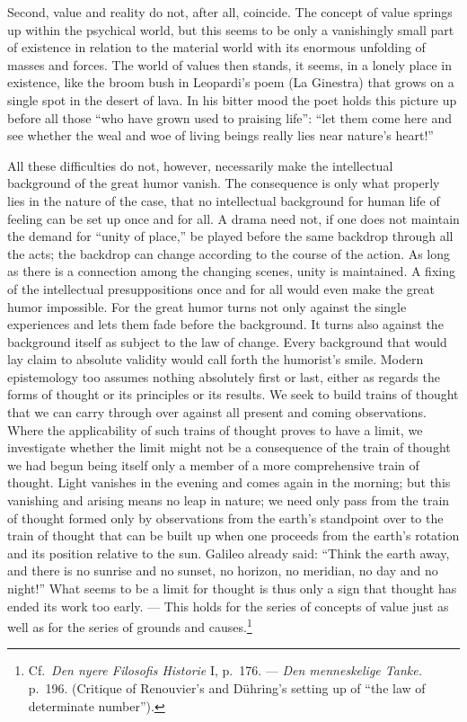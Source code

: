 \documentclass[12pt]{book}
\newcommand{\opage}[1]{\marginnote{\footnotesize\textit{[#1]}}}
\begin{document}
Second, value and reality do not, after all, coincide. The concept of value springs up
within the psychical world, but this \opage{119}seems to be only a vanishingly small part
of existence in relation to the material world with its enormous unfolding of masses and
forces. The world of values then stands, it seems, in a lonely place in existence, like the
broom bush in Leopardi's poem (La Ginestra) that grows on a single spot in the desert of
lava. In his bitter mood the poet holds this picture up before all those ``who have grown
used to praising life'': ``let them come here and see whether the weal and woe of living
beings really lies near nature's heart!''

All these difficulties do not, however, necessarily make the intellectual background of
the great humor vanish. The consequence is only what properly lies in the nature of the
case, that no intellectual background for human life of feeling can be set up once and for
all. A drama need not, if one does not maintain the demand for ``unity of place,'' be
played before the same backdrop through all the acts; the backdrop can change according to
the course of the action. As long as there is a connection among the changing scenes, unity
is maintained. A fixing of the intellectual presuppositions once and for all would even
make the great humor impossible. For the great humor turns not only against the single
experiences and lets them fade before the background. It turns also against the background
itself as subject to the law of change. Every background that would lay claim to absolute
validity would call forth the humorist's smile. Modern epistemology too assumes nothing
absolutely first or last, either as regards the forms of thought or its principles or its
results. We seek to build trains of thought that we can carry through over against all
present and coming observations. Where the applicability of such trains of thought proves
to have a limit, we investigate whether the limit might not be a consequence of the train
of thought we had begun being itself only a member of a more comprehensive train of
thought.
Light vanishes in the evening and comes again in the morning; but this vanishing
and arising means no leap in nature; we need only pass from the train of thought formed
only by observations from the earth's standpoint over to the train of thought that can
be built up when one proceeds from the earth's rotation and its position relative to
\opage{120}the sun. Galileo already said: ``Think the earth away, and there is no
sunrise and no sunset, no horizon, no meridian, no day and no night!'' What seems to be a
limit for thought is thus only a sign that thought has ended its work too early. --- This
holds for the series of concepts of value just as well as for the series of grounds and
causes.\footnote{Cf.\ \textit{Den nyere Filosofis Historie} I, p.~176. --- \textit{Den
menneskelige Tanke.} p.~196. (Critique of Renouvier's and Dühring's setting up of ``the
law of determinate number'').}
\end{document}
